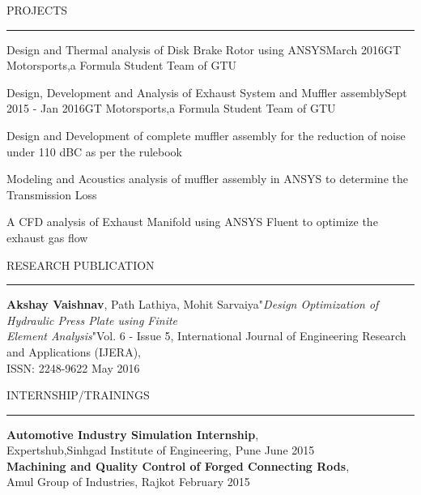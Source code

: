 \documentclass{resume} %
\renewenvironment{rSection}[1]{
\sectionskip
\textcolor{TsinghuaPurple}{\MakeUppercase{#1}}
\sectionlineskip
\hrule
\begin{list}{}{
\setlength{\leftmargin}{0em}
}
\item[]
}{
\end{list}
}
\begin{document}
\begin{rSection}{PROJECTS}
\begin{rSubsection}{Design and Thermal analysis of Disk Brake Rotor using ANSYS}{March 2016}{GT Motorsports,a Formula Student Team of GTU}{}
\end{rSubsection}


\begin{rSubsection}{Design, Development and Analysis of Exhaust System and  Muffler assembly}{Sept 2015 - Jan 2016}{GT Motorsports,a Formula Student Team of GTU}{}    

\item Design and Development of complete muffler assembly for the reduction of noise under 110 dBC as per the rulebook        
\item Modeling and Acoustics analysis of muffler assembly in ANSYS to determine the  Transmission Loss
\item A CFD analysis of Exhaust Manifold using ANSYS Fluent to optimize the exhaust gas flow

\end{rSubsection} 

\end{rSection} 

\begin{rSection}{ Research Publication } \itemsep -3pt        

{\textbf{Akshay Vaishnav}, Path Lathiya, Mohit Sarvaiya"\textit{Design Optimization of Hydraulic Press Plate using Finite \\Element Analysis}"Vol. 6 - Issue 5, International Journal of Engineering Research and Applications (IJERA), \\ISSN: 2248-9622 } \hfill May 2016 \\    
 
\end{rSection}



\begin{rSection}{INTERNSHIP/TRAININGS} \itemsep -3pt  

{\textbf{Automotive Industry Simulation Internship}, \\Expertshub,Sinhgad Institute of Engineering, Pune } \hfill June 2015 \\   
{\textbf{Machining and Quality Control of Forged Connecting Rods}, \\Amul Group of Industries, Rajkot} \hfill February 2015 \\     

\end{rSection}  
 
\end{document}
